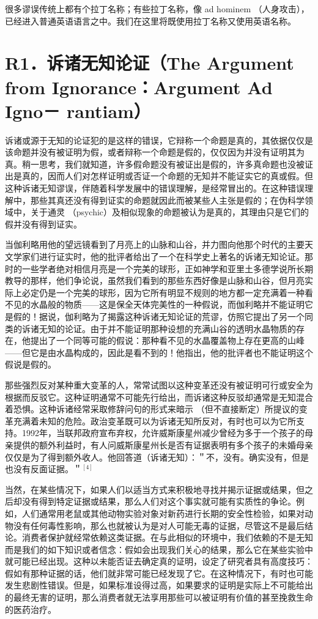 很多谬误传统上都有个拉丁名称；有些拉丁名称，像 ad hominem （人身攻击），已经进入普通英语语言之中。我们在这里将既使用拉丁名称又使用英语名称。

\section*{R1．诉诸无知论证（The Argument from Ignorance：Argument Ad Igno－ rantiam）}
诉诸或源于无知的论证犯的是这样的错误，它辩称一个命题是真的，其依据仅仅是该命题并没有被证明为假，或者辩称一个命题是假的，仅仅因为并没有证明其为真。稍一思考，我们就知道，许多假命题没有被证出是假的，许多真命题也没被证出是真的，因而人们对怎样证明或否证一个命题的无知并不能证实它的真或假。但这种诉诸无知谬误，伴随着科学发展中的错误理解，是经常冒出的。在这种错误理解中，那些其真还没有得到证实的命题就因此而被某些人主张是假的；在伪科学领域中，关于通灵 （psychic）及相似现象的命题被认为是真的，其理由只是它们的假并没有得到证实。

当伽利略用他的望远镜看到了月亮上的山脉和山谷，并力图向他那个时代的主要天文学家们进行证实时，他的批评者给出了一个在科学史上著名的诉诸无知论证。那时的一些学者绝对相信月亮是一个完美的球形，正如神学和亚里土多德学说所长期教导的那样，他们争论说，虽然我们看到的那些东西好像是山脉和山谷，但月亮实际上必定仍是一个完美的球形，因为它所有明显不规则的地方都一定充满着一种看不见的水晶般的物质——这是保全天体完美性的一种假说，而伽利略并不能证明它是假的！据说，伽利略为了揭露这种诉诸无知论证的荒谬，仿照它提出了另一个同类的诉诸无知的论证。由于并不能证明那种设想的充满山谷的透明水晶物质的存在，他提出了一个同等可能的假说：那种看不见的水晶覆盖物上存在更高的山峰——但它是由水晶构成的，因此是看不到的！他指出，他的批评者也不能证明这个假说是假的。

那些强烈反对某种重大变革的人，常常试图以这种变革还没有被证明可行或安全为根据而反驳它。这种证明通常不可能先行给出，而诉诸这种反驳却通常是无知混合着恐惧。这种诉诸经常采取修辞问句的形式来暗示 （但不直接断定）所提议的变革充满着未知的危险。政治变革既可以为诉诸无知所反对，有时也可以为它所支持。1992年，当联邦政府宣布弃权，允许威斯康星州减少曾经为多于一个孩子的母亲提供的额外利益时，有人问威斯康星州长是否有证据表明有多个孩子的未婚母亲仅仅是为了得到额外收人。他回答道（诉诸无知）：＂不，没有。确实没有，但是也没有反面证据。＂${ }^{[4]}$

当然，在某些情况下，如果人们以适当方式来积极地寻找并揭示证据或结果，但之后却没有得到特定证据或结果，那么人们对这个事实就可能有实质性的争论。例如，人们通常用老鼠或其他动物实验对象对新药进行长期的安全性检验，如果对动物没有任何毒性影响，那么也就被认为是对人可能无毒的证据，尽管这不是最后结论。消费者保护就经常依赖这类证据。在与此相似的环境中，我们依赖的不是无知而是我们的如下知识或者信念：假如会出现我们关心的结果，那么它在某些实验中就可能已经出现。这种以未能否证去确定真的证明，设定了研究者具有高度技巧：假如有那种证据的话，他们就非常可能已经发现了它。在这种情况下，有时也可能发生悲剧性错误。但是，如果标准设得过高，如果要求的证明是实际上不可能给出的最终无害的证明，那么消费者就无法享用那些可以被证明有价值的甚至挽救生命的医药治疗。


